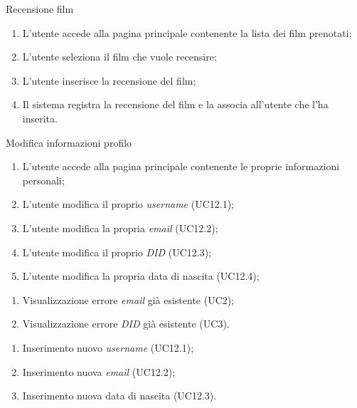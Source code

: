 \begin{usecase}{11}{Recensione film}\label{uc:recensione-film}
  \usecasemain{}
  
  \begin{enumerate}
    \item L'utente accede alla pagina principale contenente la lista dei film prenotati;
    \item L'utente seleziona il film che vuole recensire;
    \item L'utente inserisce la recensione del film;
    \item Il sistema registra la recensione del film e la associa all'utente che l'ha inserita.
  \end{enumerate}
\end{usecase}

\begin{usecase}{12}{Modifica informazioni profilo}\label{uc:modifica-informazioni-profilo}
  \usecasemain{}
  
  \begin{enumerate}
    \item L'utente accede alla pagina principale contenente le proprie informazioni personali;
    \item L'utente modifica il proprio \textit{username} (UC12.1);
    \item L'utente modifica la propria \textit{email} (UC12.2);
    \item L'utente modifica il proprio \textit{DID} (UC12.3);
    \item L'utente modifica la propria data di nascita (UC12.4);
  \end{enumerate}

  \usecaseext{}
  \begin{enumerate}
    \item Visualizzazione errore \textit{email} già esistente (UC2);
    \item Visualizzazione errore \textit{DID} già esistente (UC3).
  \end{enumerate}

  \begin{enumerate}
    \item Inserimento nuovo \textit{username} (UC12.1);
    \item Inserimento nuova \textit{email} (UC12.2);
    \item Inserimento nuova data di nascita (UC12.3).
  \end{enumerate}
\end{usecase}

